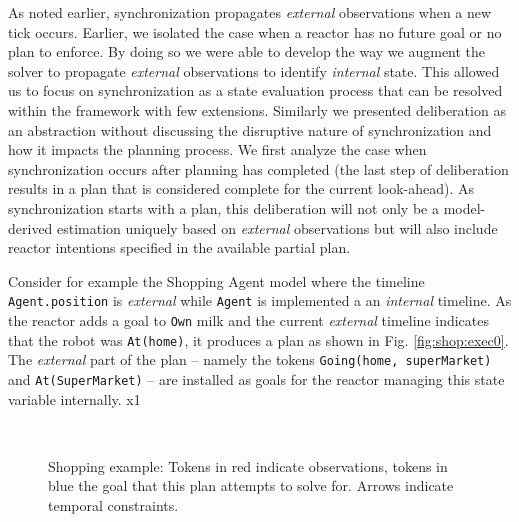 
As noted earlier, synchronization propagates {\em
  external} observations when a new tick occurs. Earlier, we isolated
the case when a reactor has no future goal or no plan to enforce. By
doing so we were able to develop the way we augment the \eu solver to
propagate {\em external} observations to identify {\em
  internal} state. This allowed us to focus on synchronization as a
state evaluation process that can be resolved within the \eu framework
with few extensions. Similarly we presented deliberation as an
abstraction without discussing the disruptive nature of
synchronization and how it impacts the planning process. We first
analyze the case when synchronization occurs after planning has
completed (\ie the last step of deliberation results in a plan that is
considered complete for the current look-ahead). As synchronization
starts with a plan, this deliberation will not only be a model-derived
estimation uniquely based on {\em external} observations but will also
include reactor intentions specified in the available partial plan.

Consider for example the Shopping Agent model where the timeline 
\texttt{Agent.position} is {\em external} while \texttt{Agent} is
implemented a an {\em internal} timeline. As the reactor adds a goal to
\texttt{Own} milk and the current {\em external} timeline indicates
that the robot was \texttt{At(home)}, it produces a plan as shown in
Fig. \ref{fig:shop:exec0}. The {\em external} part of the plan --
namely the tokens \texttt{Going(home, superMarket)} and
\texttt{At(SuperMarket)} -- are installed as goals for the reactor
managing this state variable internally.
x1
\begin{figure}[!htb]
  \centering
   \\
    \caption{\small Shopping example: Tokens in red indicate
      observations, tokens in blue the goal that this plan attempts to
      solve for. Arrows indicate temporal constraints. }
  \label{fig:shop:exec}
\end{figure}

